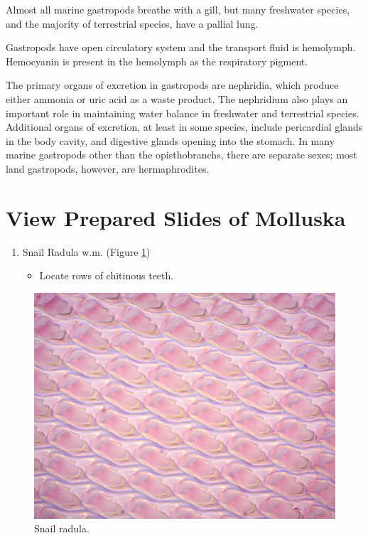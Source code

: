 Almost all marine gastropods breathe with a gill, but many freshwater
species, and the majority of terrestrial species, have a pallial lung.

Gastropods have open circulatory system and the transport fluid is
hemolymph. Hemocyanin is present in the hemolymph as the respiratory
pigment.

The primary organs of excretion in gastropods are nephridia, which
produce either ammonia or uric acid as a waste product. The nephridium
also plays an important role in maintaining water balance in freshwater
and terrestrial species. Additional organs of excretion, at least in
some species, include pericardial glands in the body cavity, and
digestive glands opening into the stomach. In many marine gastropods
other than the opisthobranchs, there are separate sexes; most land
gastropods, however, are hermaphrodites.

\section{View Prepared Slides of
Molluska}\label{view-prepared-slides-of-molluska}

\begin{enumerate}
\def\labelenumi{\arabic{enumi}.}
\tightlist
\item
  Snail Radula w.m. (Figure \ref{fig:radula})

  \begin{itemize}
  \tightlist
  \item
    Locate rows of chitinous teeth.
  \end{itemize}
\end{enumerate}

\begin{figure}

{\centering \includegraphics[width=0.7\linewidth]{./figures/rotifera/snail_radula}

}

\caption{Snail radula.}\label{fig:radula}
\end{figure}

